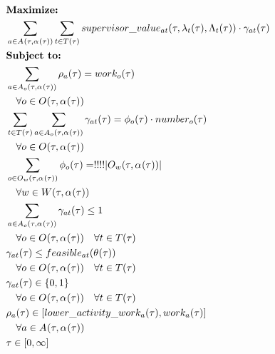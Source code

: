 \begin{alignat}{2}
	& \textbf{Maximize:} \notag\\
	& \sum_{a \in A_{}(\tau, \alpha_{}(\tau))} \sum_{t \in T(\tau)} supervisor\_value_{a t}(\tau, \lambda_{t}(\tau), \Lambda_{t}(\tau)) \cdot \gamma_{at}(\tau) \\ 
	& \textbf{Subject to:} \notag\\ 
	& \sum_{a \in A_{o}(\tau, \alpha_{}(\tau))} \rho_{a}(\tau) = work_{o}(\tau)   \notag\\
	& \quad \forall o \in O_{}(\tau, \alpha_{}(\tau))\\
	& \sum_{t \in T(\tau)} \sum_{a \in A_{o}(\tau, \alpha_{}(\tau))}\gamma_{at}(\tau) = \phi_{o}(\tau) \cdot number_{o}(\tau) \notag\\
	& \quad \forall o \in O_{}(\tau, \alpha_{}(\tau))  \\
	& \sum_{o \in O_{w}(\tau, \alpha_{}(\tau))} \phi_{o}(\tau) = !!!! |O_{w}(\tau, \alpha_{}(\tau))| \notag\\ 
	& \quad \forall w \in W(\tau,\alpha_{}(\tau)) \\
	& \sum_{a \in A_{o}(\tau, \alpha_{}(\tau))} \gamma_{at}(\tau) \leq 1 \notag\\
	& \quad \forall o \in O_{}(\tau, \alpha_{}(\tau)) \quad \forall t \in T(\tau) \\  
	& \gamma_{at}(\tau) \leq feasible_{at}(\theta_{}(\tau)) \notag\\
	& \quad \forall o \in O_{}(\tau, \alpha_{}(\tau)) \quad \forall t \in T(\tau) \\
	& \gamma_{at}(\tau) \in \{0, 1\} \notag\\
	& \quad \forall o \in O_{}(\tau, \alpha_{}(\tau)) \quad \forall t \in T(\tau) \\ 
	& \rho_{a}(\tau) \in [lower\_activity\_work_{a}(\tau), work_{a}(\tau)] \notag\\
	& \quad \forall a \in A_{}(\tau, \alpha_{}(\tau)) \\
    & \tau \in  [0, \infty] 
\end{alignat}

